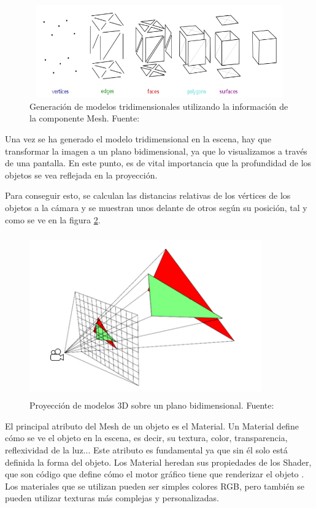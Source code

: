\documentclass[../main.tex]{subfiles}
\begin{document}
\begin{figure}[h!]
\centering
\includegraphics[width=12.5cm, height=4cm]{imagenes/Unity_Render_EDA.png}
\caption{Generación de modelos tridimensionales utilizando la información de la componente Mesh. Fuente:\cite{Unity_Render_EDA}}
\label{fig:Unity_RenderEDA}
\end{figure}

Una vez se ha generado el modelo tridimensional en la escena, hay que transformar la imagen a un plano bidimensional, ya que lo visualizamos a través de una pantalla. En este punto, es de vital importancia que la profundidad de los objetos se vea reflejada en la proyección.  

Para conseguir esto, se calculan las distancias relativas de los vértices de los objetos a la cámara y se muestran unos delante de otros según su posición, tal y como se ve en la figura \ref{fig:Unity_Projection}. 

\begin{figure}[h!]
\centering
\includegraphics[width=10cm, height=7cm]{imagenes/2D_Projection_Unity.png}
\caption{Proyección de modelos 3D sobre un plano bidimensional. Fuente:\cite{Unity_Render_EDA}}
\label{fig:Unity_Projection}
\end{figure}

El principal atributo del Mesh de un objeto es el Material. Un Material define cómo se ve el objeto en la escena, es decir, su textura, color, transparencia, reflexividad de la luz... Este atributo es fundamental ya que sin él solo está definida la forma del objeto. Los Material heredan sus propiedades de los Shader, que son código que define cómo el motor gráfico tiene que renderizar el objeto \cite{Unity_Materials}. Los materiales que se utilizan pueden ser simples colores RGB, pero también se pueden utilizar texturas más complejas y personalizadas.
\end{document}

